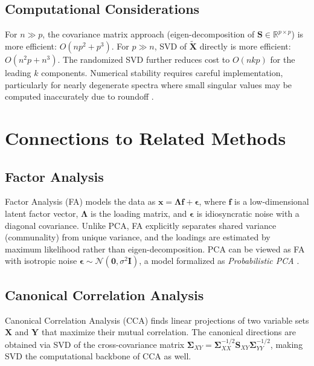 \documentclass[conference]{IEEEtran}
\begin{document}
\subsection{Computational Considerations}

For $n \gg p$, the covariance matrix approach (eigen-decomposition of $\mathbf{S} \in \mathbb{R}^{p \times p}$) is more efficient: $O(np^2 + p^3)$. For $p \gg n$, SVD of $\tilde{\mathbf{X}}$ directly is more efficient: $O(n^2p + n^3)$. The randomized SVD further reduces cost to $O(nkp)$ for the leading $k$ components. Numerical stability requires careful implementation, particularly for nearly degenerate spectra where small singular values may be computed inaccurately due to roundoff \cite{golub2013}.

\section{Connections to Related Methods}
\label{sec:related}

\subsection{Factor Analysis}

Factor Analysis (FA) \cite{spearman1904} models the data as $\mathbf{x} = \mathbf{\Lambda}\mathbf{f} + \bm{\epsilon}$, where $\mathbf{f}$ is a low-dimensional latent factor vector, $\mathbf{\Lambda}$ is the loading matrix, and $\bm{\epsilon}$ is idiosyncratic noise with a diagonal covariance. Unlike PCA, FA explicitly separates shared variance (communality) from unique variance, and the loadings are estimated by maximum likelihood rather than eigen-decomposition. PCA can be viewed as FA with isotropic noise $\bm{\epsilon} \sim \mathcal{N}(\mathbf{0}, \sigma^2\mathbf{I})$, a model formalized as \emph{Probabilistic PCA} \cite{tipping1999}.

\subsection{Canonical Correlation Analysis}

Canonical Correlation Analysis (CCA) \cite{hotelling1936} finds linear projections of two variable sets $\mathbf{X}$ and $\mathbf{Y}$ that maximize their mutual correlation. The canonical directions are obtained via SVD of the cross-covariance matrix $\mathbf{\Sigma}_{XY} = \mathbf{\Sigma}_{XX}^{-1/2}\mathbf{S}_{XY}\mathbf{\Sigma}_{YY}^{-1/2}$, making SVD the computational backbone of CCA as well.
\end{document}
